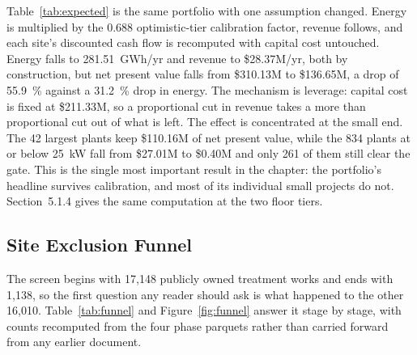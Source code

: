 \documentclass[12pt,letterpaper]{report}
\begin{document}
Table~\ref{tab:expected} is the same portfolio with one assumption changed. Energy
is multiplied by the 0.688 optimistic-tier calibration factor, revenue follows, and each
site's discounted cash flow is recomputed with capital cost untouched. Energy
falls to 281.51~GWh/yr and revenue to \$28.37M/yr, both by construction, but net
present value falls from \$310.13M to \$136.65M, a drop of 55.9~\% against a
31.2~\% drop in energy. The mechanism is leverage: capital cost is fixed at
\$211.33M, so a proportional cut in revenue takes a more than proportional cut out
of what is left. The effect is concentrated at the small end. The 42 largest
plants keep \$110.16M of net present value, while the 834 plants at or below
25~kW fall from \$27.01M to \$0.40M and only 261 of them still clear the gate.
This is the single most important result in the chapter: the portfolio's headline
survives calibration, and most of its individual small projects do not.
Section~5.1.4 gives the same computation at the two floor tiers.

\subsection{Site Exclusion Funnel}                       %

The screen begins with 17{,}148 publicly owned treatment works and ends with
1{,}138, so the first question any reader should ask is what happened to the other
16{,}010. Table~\ref{tab:funnel} and Figure~\ref{fig:funnel} answer it stage by
stage, with counts recomputed from the four phase parquets rather than carried
forward from any earlier document.
\end{document}
